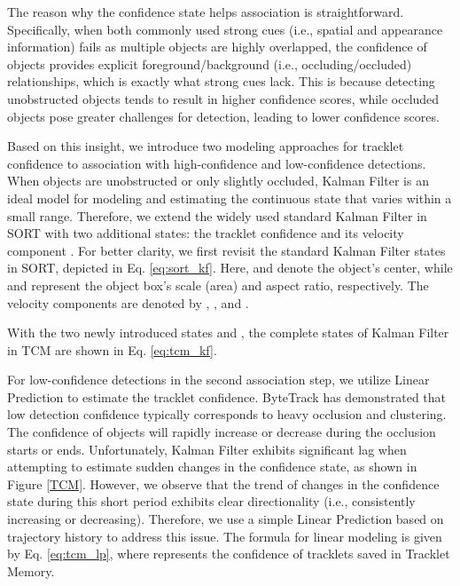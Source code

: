 \documentclass[letterpaper]{article} \usepackage{aaai23}  \usepackage{times}  \usepackage{helvet}  \usepackage{courier}  \usepackage[hyphens]{url}  \usepackage{graphicx} \urlstyle{rm} \def\UrlFont{\rm}  \usepackage{natbib}  \usepackage{caption} \frenchspacing  \setlength{\pdfpagewidth}{8.5in}  \setlength{\pdfpageheight}{11in}  \usepackage{algorithm}
\begin{document}
The reason why the confidence state helps association is straightforward. Specifically, when both commonly used strong cues (i.e., spatial and appearance information) fails as multiple objects are highly overlapped, the confidence of objects provides explicit foreground/background (i.e., occluding/occluded) relationships, which is exactly what strong cues lack. This is because detecting unobstructed objects tends to result in higher confidence scores, while occluded objects pose greater challenges for detection, leading to lower confidence scores.

Based on this insight, we introduce two modeling approaches for tracklet confidence to association with high-confidence and low-confidence detections. When objects are unobstructed or only slightly occluded, Kalman Filter is an ideal model for modeling and estimating the continuous state that varies within a small range. Therefore, we extend the widely used standard Kalman Filter in SORT \textcolor{blue}{\cite{bewley2016simple}} with two additional states: the tracklet confidence  and its velocity component . For better clarity, we first revisit the standard Kalman Filter states in SORT, depicted in Eq. \ref{eq:sort_kf}. Here,  and  denote the object's center, while  and  represent the object box's scale (area) and aspect ratio, respectively. The velocity components are denoted by , , and . 



With the two newly introduced states  and , the complete states of Kalman Filter in TCM are shown in Eq. \ref{eq:tcm_kf}. 



For low-confidence detections in the second association step, we utilize Linear Prediction to estimate the tracklet confidence. ByteTrack has demonstrated that low detection confidence typically corresponds to heavy occlusion and clustering. The confidence of objects will rapidly increase or decrease during the occlusion starts or ends. Unfortunately, Kalman Filter exhibits significant lag when attempting to estimate sudden changes in the confidence state, as shown in Figure \ref{TCM}. However, we observe that the trend of changes in the confidence state during this short period exhibits clear directionality (i.e., consistently increasing or decreasing). Therefore, we use a simple Linear Prediction based on trajectory history to address this issue. The formula for linear modeling is given by Eq. \ref{eq:tcm_lp}, where  represents the confidence of tracklets saved in Tracklet Memory.
\end{document}
